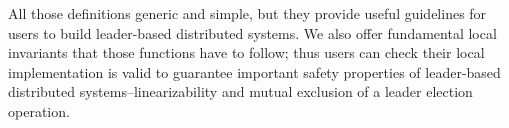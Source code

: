 All those definitions generic and simple, but they provide useful guidelines for users to build leader-based distributed systems. We also offer fundamental local invariants that those functions have to follow; thus users can check their local implementation is valid to guarantee important safety properties of leader-based distributed systems--linearizability and mutual exclusion of a leader election operation.